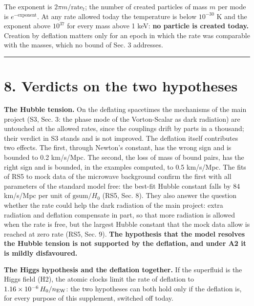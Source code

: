 \documentclass[
  10pt,
]{article}
\begin{document}
The exponent is \(2\pi m/\mathrm{rate}_t\); the number of created
particles of mass \(m\) per mode is \(e^{-\text{exponent}}\). At any
rate allowed today the temperature is below \(10^{-30}\) K and the
exponent above \(10^{37}\) for every mass above 1 keV: \textbf{no
particle is created today.} Creation by deflation matters only for an
epoch in which the rate was comparable with the masses, which no bound
of Sec. 3 addresses.

\begin{center}\rule{0.5\linewidth}{0.5pt}\end{center}

\hypertarget{verdicts-on-the-two-hypotheses}{%
\section{8. Verdicts on the two
hypotheses}\label{verdicts-on-the-two-hypotheses}}

\textbf{The Hubble tension.} On the deflating spacetimes the mechanisms
of the main project (S3, Sec. 3: the phase mode of the Vorton-Scalar as
dark radiation) are untouched at the allowed rates, since the couplings
drift by parts in a thousand; their verdict in S3 stands and is not
improved. The deflation itself contributes two effects. The first,
through Newton's constant, has the wrong sign and is bounded to 0.2
km/s/Mpc. The second, the loss of mass of bound pairs, has the right
sign and is bounded, in the examples computed, to 0.5 km/s/Mpc. The fits
of RS5 to mock data of the microwave background confirm the first with
all parameters of the standard model free: the best-fit Hubble constant
falls by 84 km/s/Mpc per unit of \(\mathrm{gsum}/H_0\) (RS5, Sec. 8).
They also answer the question whether the rate could help the dark
radiation of the main project: extra radiation and deflation compensate
in part, so that more radiation is allowed when the rate is free, but
the largest Hubble constant that the mock data allow is reached at zero
rate (RS5, Sec. 9). \textbf{The hypothesis that the model resolves the
Hubble tension is not supported by the deflation, and under A2 it is
mildly disfavoured.}

\textbf{The Higgs hypothesis and the deflation together.} If the
superfluid is the Higgs field (H2), the atomic clocks limit the rate of
deflation to \(1.16\times10^{-6}\,H_0/n_{\rm EW}\): the two hypotheses
can both hold only if the deflation is, for every purpose of this
supplement, switched off today.
\end{document}
